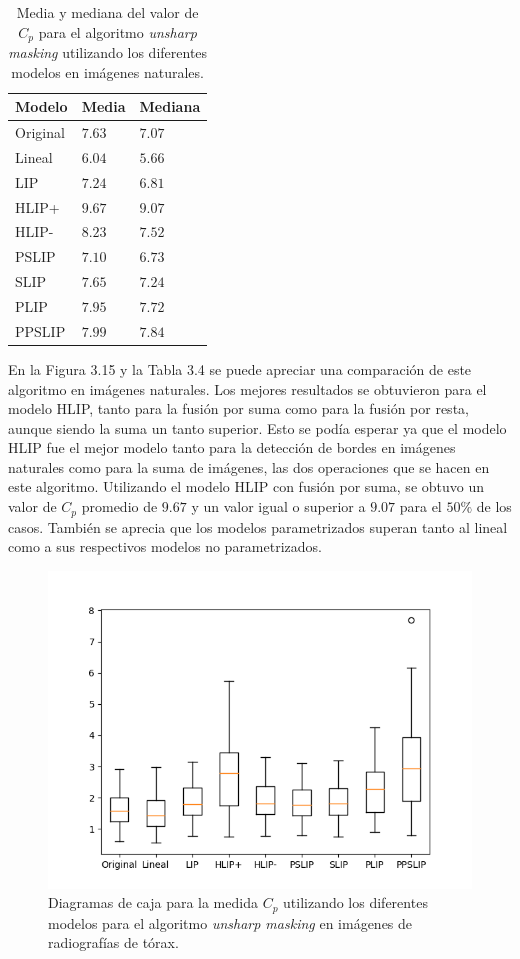 \begin{table}
	\begin{center}
		\begin{tabular}{|l|l|l|}
			\hline 
			Modelo & Media & Mediana\\
			\hline
			Original & $7.63$ & $7.07$\\
			\hline
			Lineal & $6.04$ & $5.66$\\
			\hline
			LIP & $7.24$ & $6.81$\\
			\hline
			HLIP+ & $9.67$ & $9.07$\\
			\hline
			HLIP- & $8.23$ & $7.52$\\
			\hline
			PSLIP & $7.10$ & $6.73$\\
			\hline
			SLIP & $7.65$ & $7.24$\\
			\hline
			PLIP & $7.95$ & $7.72$\\
			\hline
			PPSLIP & $7.99$ & $7.84$\\
			\hline
		\end{tabular}
		\caption{Media y mediana del valor de $C_p$ para el algoritmo \textit{unsharp masking} utilizando los diferentes modelos en im\'agenes naturales.}
	\end{center}
\end{table}

En la Figura 3.15 y la Tabla 3.4 se puede apreciar una comparaci\'on de este algoritmo en im\'agenes naturales. Los mejores resultados se obtuvieron para el modelo HLIP, tanto para la fusi\'on por suma como para la fusi\'on por resta, aunque siendo la suma un tanto superior. Esto se pod\'ia esperar ya que el modelo HLIP fue el mejor modelo tanto para la detecci\'on de bordes en im\'agenes naturales como para la suma de im\'agenes, las dos operaciones que se hacen en este algoritmo. Utilizando el modelo HLIP con fusi\'on por suma, se obtuvo un valor de $C_p$ promedio de $9.67$ y un valor igual o superior a $9.07$ para el $50\%$ de los casos. Tambi\'en se aprecia que los modelos parametrizados superan tanto al lineal como a sus respectivos modelos no parametrizados.

\begin{figure}[h]
	\begin{center}
		\includegraphics[width=10.0 cm]{images/graphics/torax/unsharp_masking/um_all.png}
		\caption{Diagramas de caja para la medida $C_p$ utilizando los diferentes modelos para el algoritmo \textit{unsharp masking} en im\'agenes de radiograf\'ias de t\'orax.}
	\end{center}
\end{figure}

